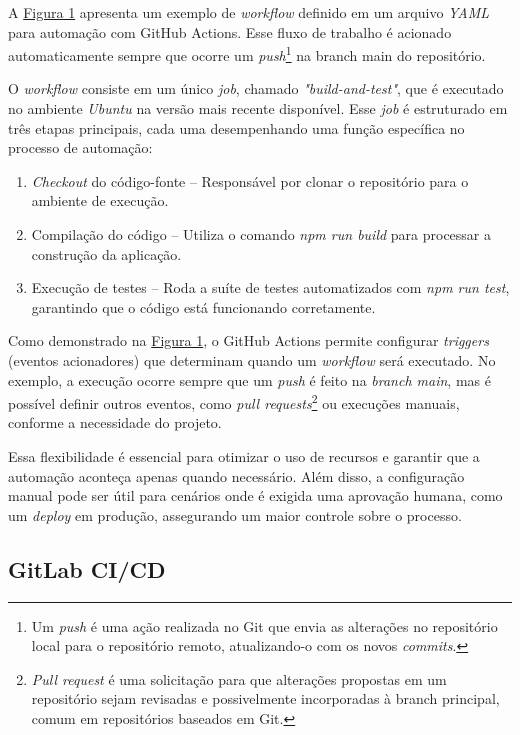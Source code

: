 A \hyperref[codigo:codigoGithub]{Figura 1} apresenta um exemplo de \textit{workflow} definido em um arquivo \textit{YAML} para automação com GitHub Actions. Esse fluxo de trabalho é acionado automaticamente sempre que ocorre um \textit{push}\footnote{Um \textit{push} é uma ação realizada no Git que envia as alterações no repositório local para o repositório remoto, atualizando-o com os novos \textit{commits}.} na branch main do repositório.

O \textit{workflow} consiste em um único \textit{job}, chamado \textit{"build-and-test"}, que é executado no ambiente \textit{Ubuntu} na versão mais recente disponível. Esse \textit{job} é estruturado em três etapas principais, cada uma desempenhando uma função específica no processo de automação:

\begin{enumerate}
    \item \textit{Checkout} do código-fonte – Responsável por clonar o repositório para o ambiente de execução.
    \item Compilação do código – Utiliza o comando \textit{npm run build} para processar a construção da aplicação.
    \item Execução de testes – Roda a suíte de testes automatizados com \textit{npm run test}, garantindo que o código está funcionando corretamente.
\end{enumerate}

Como demonstrado na \hyperref[codigo:codigoGithub]{Figura 1}, o GitHub Actions permite configurar \textit{triggers} (eventos acionadores) que determinam quando um \textit{workflow} será executado. No exemplo, a execução ocorre sempre que um \textit{push} é feito na \textit{branch main}, mas é possível definir outros eventos, como \textit{pull requests}\footnote{\textit{Pull request} é uma solicitação para que alterações propostas em um repositório sejam revisadas e possivelmente incorporadas à branch principal, comum em repositórios baseados em Git.} ou execuções manuais, conforme a necessidade do projeto.

Essa flexibilidade é essencial para otimizar o uso de recursos e garantir que a automação aconteça apenas quando necessário. Além disso, a configuração manual pode ser útil para cenários onde é exigida uma aprovação humana, como um \textit{deploy} em produção, assegurando um maior controle sobre o processo.

\subsection{GitLab CI/CD} \label{section:Gitlab}

